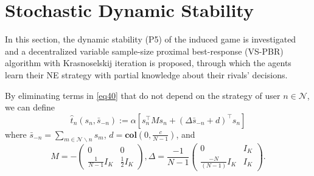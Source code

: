 \documentclass[twocolumn]{autart}
\begin{document}
\section{Stochastic Dynamic Stability}
In this section, the dynamic stability (P5) of the induced game is investigated and a decentralized variable sample-size proximal best-response (VS-PBR) \cite{lei2022distributed} algorithm with Krasnoselskij iteration is proposed, through which the agents learn their NE strategy with partial knowledge about their rivals' decisions. 
\par
By eliminating terms in \eqref{eq40} that do not depend on the strategy of user $n\in\mathcal{N}$, we can define \[\hat{t}_n(s_n, \bar{s}_{-n}):=\alpha [s_n^\top Ms_n + (\Delta \bar{s}_{-n}+d)^\top s_n]\] where $\bar{s}_{-n}=\sum_{m\in \mathcal{N}\backslash n}{s_m}$, $d=\textbf{col}(0, \frac{c}{N-1})$, and 
\[
            M=-\begin{pmatrix}
                0 & 0\\
                \frac{1}{N-1}I_{K} & \frac{1}{2}I_{K}
            \end{pmatrix},  \Delta = \frac{-1}{N-1}\begin{pmatrix}
                0 & I_{K}\\
                \frac{-N}{(N-1)}I_{K} & I_{K}
            \end{pmatrix}.
\]
\end{document}
